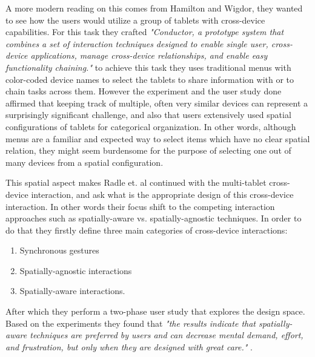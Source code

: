 A more modern reading on this comes from Hamilton and Wigdor, they wanted to see how the users would utilize a group of tablets with cross-device capabilities. For this task they crafted\emph{ "Conductor, a prototype system that combines a set of interaction techniques designed to enable single user, cross-device applications, manage cross-device relationships, and enable easy functionality chaining."} \cite{Hamilton:2014} to achieve this task they uses traditional menus with color-coded device names to select the tablets to share information with or to chain tasks across them. However the experiment and the user study done affirmed that keeping track of multiple, often very similar devices can represent a surprisingly significant challenge, and also that users extensively used spatial configurations of tablets for categorical organization. In other words, although menus are a familiar and expected way to select items which have no clear spatial relation, they might seem burdensome for the purpose of selecting one out of many devices from a spatial configuration.  

This spatial aspect makes Radle et. al continued with the multi-tablet cross-device interaction, and ask what is the appropriate design of this cross-device interaction. In other words their focus shift to the competing interaction approaches such as spatially-aware vs. spatially-agnostic techniques. In order to do that they firstly define three main categories of cross-device interactions: 
\begin{enumerate}[topsep=0pt,itemsep=1ex,partopsep=1ex,parsep=1ex]
	\item Synchronous gestures
	\item Spatially-agnostic interactions
	\item Spatially-aware interactions. 
\end{enumerate} After which they perform a two-phase user study that explores the design space. Based on the experiments they found that \emph{"the results indicate that spatially-aware techniques are preferred by users and can decrease mental demand, effort, and frustration, but only when they are designed with great care."} \cite{Radle:2015}.

